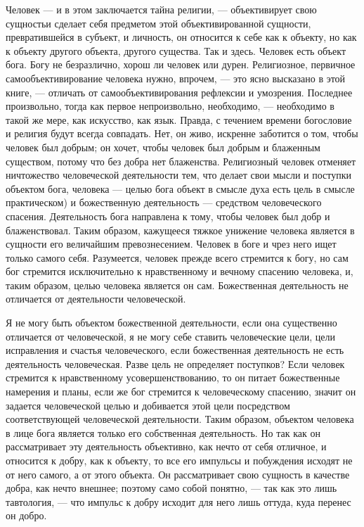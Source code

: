 \documentclass[12pt,oneside]{book}
\begin{document}
Человек --- и в этом заключается тайна религии, --- объективирует свою сущность\ddag\let\svthefootnote\thefootnote\let\thefootnote\relax{}\let\thefootnote\svthefootnote и сделает себя предметом этой объективированной сущности, превратившейся в субъект, и личность, он относится к себе как к объекту, но как к объекту другого объекта, другого существа. Так и здесь. Человек есть объект бога. Богу не безразлично, хорош ли человек или дурен. Религиозное, первичное самообъективирование человека нужно, впрочем, --- это ясно высказано в этой книге, --- отличать от самообъективирования рефлексии и умозрения. Последнее произвольно, тогда как первое непроизвольно, необходимо, --- необходимо в такой же мере, как искусство, как язык. Правда, с течением времени богословие и религия будут всегда совпадать. Нет, он живо, искренне заботится о том, чтобы человек был добрым; он хочет, чтобы человек был добрым и блаженным существом, потому что без добра нет блаженства. Религиозный человек отменяет ничтожество человеческой деятельности тем, что делает свои мысли и поступки объектом бога, человека --- целью бога объект в смысле духа есть цель в смысле практическом) и божественную деятельность --- средством человеческого спасения. Деятельность бога направлена к тому, чтобы человек был добр и блаженствовал. Таким образом, кажущееся тяжкое унижение человека является в сущности его величайшим превознесением. Человек в боге и чрез него ищет только самого себя. Разумеется, человек прежде всего стремится к богу, но сам бог стремится исключительно к нравственному и вечному спасению человека, и, таким образом, целью человека является он сам. Божественная деятельность не отличается от деятельности человеческой.



Я не могу быть объектом божественной деятельности, если она существенно отличается от человеческой, я не могу себе ставить человеческие цели, цели исправления и счастья человеческого, если божественная деятельность не есть деятельность человеческая. Разве цель не определяет поступков? Если человек стремится к нравственному усовершенствованию, то он питает божественные намерения и планы, если же бог стремится к человеческому спасению, значит он задается человеческой целью и добивается этой цели посредством соответствующей человеческой деятельности. Таким образом, объектом человека в лице бога является только его собственная деятельность. Но так как он рассматривает эту деятельность объективно, как нечто от себя отличное, и относится к добру, как к объекту, то все его импульсы и побуждения исходят не от него самого, а от этого объекта. Он рассматривает свою сущность в качестве добра, как нечто внешнее; поэтому само собой понятно, --- так как это лишь тавтология, --- что импульс к добру исходит для него лишь оттуда, куда перенес он добро.
\end{document}

